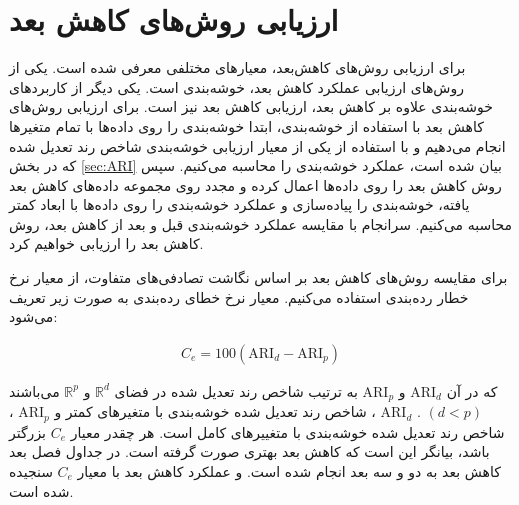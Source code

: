 \section{
ارزیابی روش‌های کاهش بعد
}
\label{sec:ari_ce}

برای ارزیابی روش‌های کاهش‌بعد، معیا‌ر‌های مختلفی معرفی شده است.%
\cite{gracia2014methodology}
یکی از روش‌های ارزیابی عملکرد کاهش بعد، خوشه‌بندی است. یکی دیگر از کاربردهای خوشه‌بندی علاوه بر کاهش بعد، ارزیابی کاهش بعد نیز است. برای ارزیابی روش‌های کاهش بعد با استفاده از خوشه‌بندی، ابتدا خوشه‌بندی را روی داده‌ها با تمام متغیرها انجام می‌دهیم و با استفاده از یکی از معیار ارزیابی خوشه‌بندی شاخص رند تعدیل شده که در بخش 
\ref{sec:ARI}
بیان شده است، عملکرد خوشه‌بندی را محاسبه می‌کنیم. سپس روش کاهش بعد را روی داده‌ها اعمال کرده و مجدد روی مجموعه داده‌های کاهش بعد یافته، خوشه‌بندی را پیاده‌سازی و عملکرد خوشه‌بندی را روی داده‌ها با ابعاد کمتر محاسبه می‌کنیم. سرانجام با مقایسه عملکرد خوشه‌بندی قبل و بعد از کاهش بعد، روش کاهش بعد را ارزیابی خواهیم کرد.

برای مقایسه روش‌های کاهش بعد بر اساس نگاشت تصادفی‌های متفاوت، از معیار نرخ خطار رده‌بندی استفاده می‌کنیم. معیار نرخ خطای رده‌بندی به صورت زیر تعریف می‌شود:

\begin{align}
C_e = 100 ( \mathrm{ARI}_d - \mathrm{ARI}_p )
\label{eq:1jT}
\end{align}

که در آن 
$\mathrm{ARI}_d$
و 
‌$\mathrm{ARI}_p$
به ترتیب شاخص رند تعدیل شده در فضای 
$\mathbb{R}^d$
و 
$\mathbb{R}^p$
می‌باشند
$(d < p)$
. 
$\mathrm{ARI}_d$
، شاخص رند تعدیل شده خوشه‌بندی با متغیرهای کمتر و 
$\mathrm{ARI}_p$
، شاخص رند تعدیل شده خوشه‌بندی با متغییرهای کامل است. هر چقدر معیار
$C_e$
بزرگتر باشد، بیانگر این است که کاهش بعد بهتری صورت گرفته است.
در جداول فصل بعد کاهش بعد به دو و سه بعد انجام شده است. و عملکرد کاهش بعد با معیار $C_e$ سنجیده شده است.



